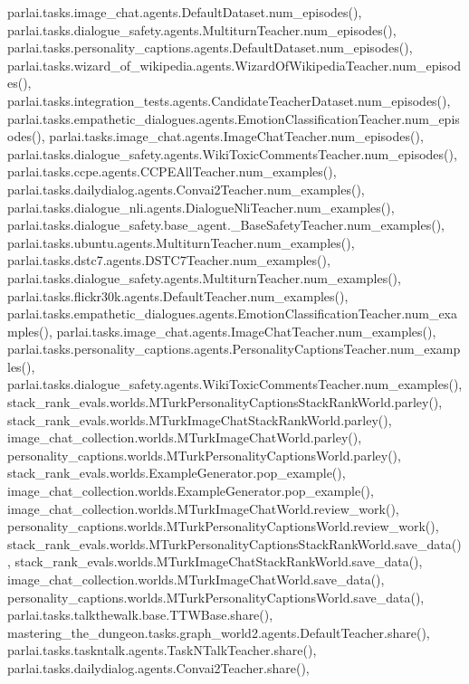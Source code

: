 parlai.\+tasks.\+image\+\_\+chat.\+agents.\+Default\+Dataset.\+num\+\_\+episodes(), parlai.\+tasks.\+dialogue\+\_\+safety.\+agents.\+Multiturn\+Teacher.\+num\+\_\+episodes(), parlai.\+tasks.\+personality\+\_\+captions.\+agents.\+Default\+Dataset.\+num\+\_\+episodes(), parlai.\+tasks.\+wizard\+\_\+of\+\_\+wikipedia.\+agents.\+Wizard\+Of\+Wikipedia\+Teacher.\+num\+\_\+episodes(), parlai.\+tasks.\+integration\+\_\+tests.\+agents.\+Candidate\+Teacher\+Dataset.\+num\+\_\+episodes(), parlai.\+tasks.\+empathetic\+\_\+dialogues.\+agents.\+Emotion\+Classification\+Teacher.\+num\+\_\+episodes(), parlai.\+tasks.\+image\+\_\+chat.\+agents.\+Image\+Chat\+Teacher.\+num\+\_\+episodes(), parlai.\+tasks.\+dialogue\+\_\+safety.\+agents.\+Wiki\+Toxic\+Comments\+Teacher.\+num\+\_\+episodes(), parlai.\+tasks.\+ccpe.\+agents.\+C\+C\+P\+E\+All\+Teacher.\+num\+\_\+examples(), parlai.\+tasks.\+dailydialog.\+agents.\+Convai2\+Teacher.\+num\+\_\+examples(), parlai.\+tasks.\+dialogue\+\_\+nli.\+agents.\+Dialogue\+Nli\+Teacher.\+num\+\_\+examples(), parlai.\+tasks.\+dialogue\+\_\+safety.\+base\+\_\+agent.\+\_\+\+Base\+Safety\+Teacher.\+num\+\_\+examples(), parlai.\+tasks.\+ubuntu.\+agents.\+Multiturn\+Teacher.\+num\+\_\+examples(), parlai.\+tasks.\+dstc7.\+agents.\+D\+S\+T\+C7\+Teacher.\+num\+\_\+examples(), parlai.\+tasks.\+dialogue\+\_\+safety.\+agents.\+Multiturn\+Teacher.\+num\+\_\+examples(), parlai.\+tasks.\+flickr30k.\+agents.\+Default\+Teacher.\+num\+\_\+examples(), parlai.\+tasks.\+empathetic\+\_\+dialogues.\+agents.\+Emotion\+Classification\+Teacher.\+num\+\_\+examples(), parlai.\+tasks.\+image\+\_\+chat.\+agents.\+Image\+Chat\+Teacher.\+num\+\_\+examples(), parlai.\+tasks.\+personality\+\_\+captions.\+agents.\+Personality\+Captions\+Teacher.\+num\+\_\+examples(), parlai.\+tasks.\+dialogue\+\_\+safety.\+agents.\+Wiki\+Toxic\+Comments\+Teacher.\+num\+\_\+examples(), stack\+\_\+rank\+\_\+evals.\+worlds.\+M\+Turk\+Personality\+Captions\+Stack\+Rank\+World.\+parley(), stack\+\_\+rank\+\_\+evals.\+worlds.\+M\+Turk\+Image\+Chat\+Stack\+Rank\+World.\+parley(), image\+\_\+chat\+\_\+collection.\+worlds.\+M\+Turk\+Image\+Chat\+World.\+parley(), personality\+\_\+captions.\+worlds.\+M\+Turk\+Personality\+Captions\+World.\+parley(), stack\+\_\+rank\+\_\+evals.\+worlds.\+Example\+Generator.\+pop\+\_\+example(), image\+\_\+chat\+\_\+collection.\+worlds.\+Example\+Generator.\+pop\+\_\+example(), image\+\_\+chat\+\_\+collection.\+worlds.\+M\+Turk\+Image\+Chat\+World.\+review\+\_\+work(), personality\+\_\+captions.\+worlds.\+M\+Turk\+Personality\+Captions\+World.\+review\+\_\+work(), stack\+\_\+rank\+\_\+evals.\+worlds.\+M\+Turk\+Personality\+Captions\+Stack\+Rank\+World.\+save\+\_\+data(), stack\+\_\+rank\+\_\+evals.\+worlds.\+M\+Turk\+Image\+Chat\+Stack\+Rank\+World.\+save\+\_\+data(), image\+\_\+chat\+\_\+collection.\+worlds.\+M\+Turk\+Image\+Chat\+World.\+save\+\_\+data(), personality\+\_\+captions.\+worlds.\+M\+Turk\+Personality\+Captions\+World.\+save\+\_\+data(), parlai.\+tasks.\+talkthewalk.\+base.\+T\+T\+W\+Base.\+share(), mastering\+\_\+the\+\_\+dungeon.\+tasks.\+graph\+\_\+world2.\+agents.\+Default\+Teacher.\+share(), parlai.\+tasks.\+taskntalk.\+agents.\+Task\+N\+Talk\+Teacher.\+share(), parlai.\+tasks.\+dailydialog.\+agents.\+Convai2\+Teacher.\+share(), 